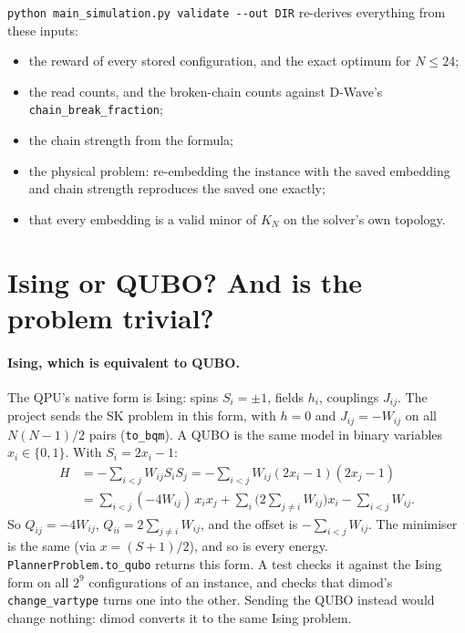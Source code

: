 \documentclass[11pt,a4paper]{article}
\newcommand{\code}[1]{\nolinkurl{#1}}
\newcommand{\src}[4]{}
\begin{document}
\code{python main_simulation.py validate --out DIR} re-derives everything from these inputs:
\begin{itemize}
\item the reward of every stored configuration, and the exact optimum for $N\le24$;
\item the read counts, and the broken-chain counts against D-Wave's \code{chain_break_fraction};
\item the chain strength from the formula;
\item the physical problem: re-embedding the instance with the saved embedding and chain strength reproduces the saved one exactly;
\item that every embedding is a valid minor of $K_N$ on the solver's own topology.
\end{itemize}
\src{main_simulation.py}{\rValidateA}{\rValidateB}{\code{validate}}

\section{Ising or QUBO? And is the problem trivial?}
\paragraph{Ising, which is equivalent to QUBO.} The QPU's native form is Ising: spins $S_i=\pm1$, fields $h_i$, couplings $J_{ij}$. The project sends the SK problem in this form, with $h=0$ and $J_{ij}=-W_{ij}$ on all $N(N-1)/2$ pairs (\code{to_bqm}). A QUBO is the same model in binary variables $x_i\in\{0,1\}$. With $S_i=2x_i-1$:
\begin{align}
H&=-\sum_{i<j}W_{ij}S_iS_j=-\sum_{i<j}W_{ij}(2x_i-1)(2x_j-1)\nonumber\\
&=\sum_{i<j}(-4W_{ij})\,x_ix_j+\sum_i\Big(2\sum_{j\ne i}W_{ij}\Big)x_i-\sum_{i<j}W_{ij}.
\end{align}
So $Q_{ij}=-4W_{ij}$, $Q_{ii}=2\sum_{j\ne i}W_{ij}$, and the offset is $-\sum_{i<j}W_{ij}$. The minimiser is the same (via $x=(S+1)/2$), and so is every energy. \code{PlannerProblem.to_qubo} returns this form. A test checks it against the Ising form on all $2^9$ configurations of an instance, and checks that dimod's \code{change_vartype} turns one into the other. Sending the QUBO instead would change nothing: dimod converts it to the same Ising problem.
\src{skgame/optim/problem.py}{\rQuboA}{\rQuboB}{the QUBO form}
\end{document}
